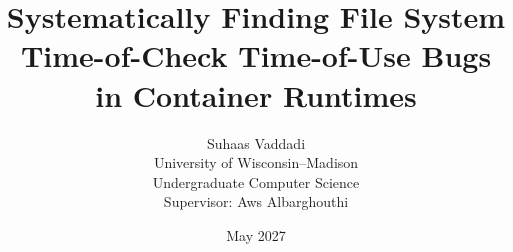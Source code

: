 \title{\bfseries Systematically Finding File System Time-of-Check Time-of-Use Bugs in Container Runtimes}
\author{
  Suhaas Vaddadi\\[0.5em]
  University of Wisconsin--Madison\\
  Undergraduate Computer Science\\[0.5em]
  Supervisor: Aws Albarghouthi
}
\date{May 2027}
